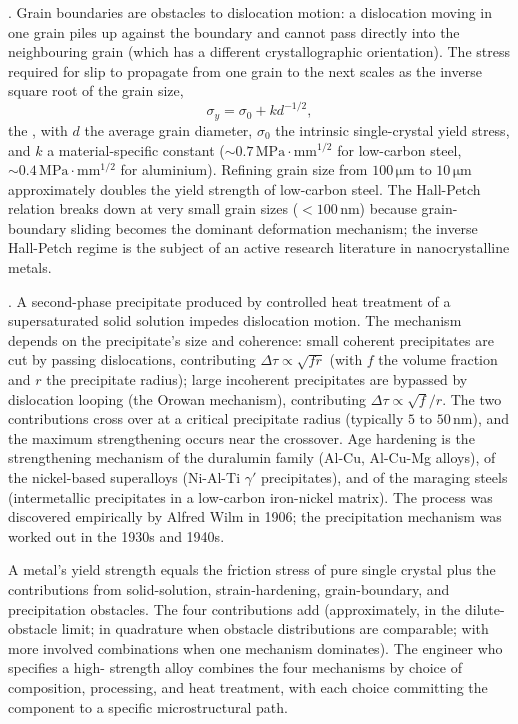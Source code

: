 . Grain boundaries are
obstacles to dislocation motion: a dislocation moving in one grain
piles up against the boundary and cannot pass directly into the
neighbouring grain (which has a different crystallographic
orientation). The stress required for slip to propagate from one
grain to the next scales as the inverse square root of the grain
size,
\[
\sigma_y = \sigma_0 + k d^{-1/2},
\]
the , with $d$ the average grain
diameter, $\sigma_0$ the intrinsic single-crystal yield stress, and
$k$ a material-specific constant ($\sim 0.7\,\text{MPa}\cdot\text{mm}^{1/2}$
for low-carbon steel, $\sim 0.4\,\text{MPa}\cdot\text{mm}^{1/2}$ for
aluminium). Refining grain size from $100\,\si{\micro\meter}$ to
$10\,\si{\micro\meter}$ approximately doubles the yield strength of
low-carbon steel. The Hall-Petch relation breaks down at very small
grain sizes ($< 100\,\text{nm}$) because grain-boundary sliding
becomes the dominant deformation mechanism; the inverse Hall-Petch
regime is the subject of an active research literature in
nanocrystalline metals.

. A second-phase
precipitate produced by controlled heat treatment of a supersaturated
solid solution impedes dislocation motion. The mechanism depends on
the precipitate's size and coherence: small coherent precipitates
are cut by passing dislocations, contributing $\Delta \tau \propto
\sqrt{f r}$ (with $f$ the volume fraction and $r$ the precipitate
radius); large incoherent precipitates are bypassed by dislocation
looping (the Orowan mechanism), contributing $\Delta \tau \propto
\sqrt{f}/r$. The two contributions cross over at a critical
precipitate radius (typically $5$ to $50\,\text{nm}$), and the
maximum strengthening occurs near the crossover. Age hardening is
the strengthening mechanism of the duralumin family (Al-Cu, Al-Cu-Mg
alloys), of the nickel-based superalloys (Ni-Al-Ti $\gamma'$
precipitates), and of the maraging steels (intermetallic precipitates
in a low-carbon iron-nickel matrix). The process was discovered
empirically by Alfred Wilm in 1906; the precipitation mechanism was
worked out in the 1930s and 1940s.

\begin{principle}
A metal's yield strength equals the friction stress of pure single
crystal plus the contributions from solid-solution, strain-hardening,
grain-boundary, and precipitation obstacles. The four contributions
add (approximately, in the dilute-obstacle limit; in quadrature when
obstacle distributions are comparable; with more involved combinations
when one mechanism dominates). The engineer who specifies a high-
strength alloy combines the four mechanisms by choice of composition,
processing, and heat treatment, with each choice committing the
component to a specific microstructural path.
\end{principle}

